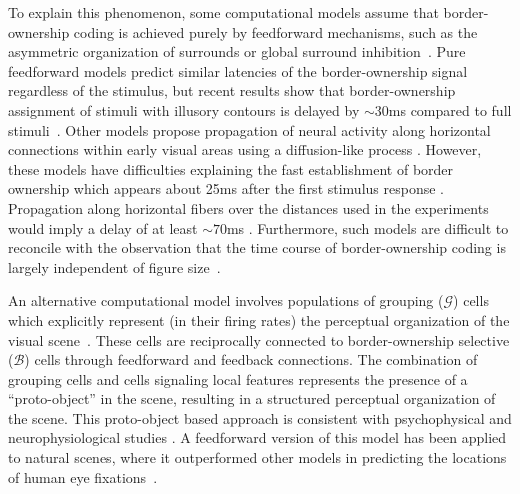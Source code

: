 \documentclass[12pt]{article}
\newcommand{\eg}[0]{{\em e.g.}\xspace}
\begin{document}
 To explain this phenomenon, some computational models assume that
border-ownership coding is achieved purely by feedforward mechanisms, such as the
asymmetric organization of surrounds \citep{Nishimura_Sakai04,
 Nishimura_Sakai05,Sakai_etal12} or global surround inhibition~\citep{Super_etal10}.
 Pure feedforward models predict similar latencies of the border-ownership signal regardless of the stimulus, but recent results show that border-ownership assignment of stimuli with illusory contours is delayed by $\sim30$ms compared to full stimuli~\citep{Hesse_Tsao16}.
  Other models propose
 propagation of neural
activity along horizontal connections within early visual
areas using a diffusion-like process \citep{Grossberg94, Sajda_Finkel95,
Baek_Sajda05, Kikuchi_Akashi01, Pao_etal99,
Zhaoping05}. However, these models have difficulties explaining the
fast establishment of border ownership which appears about 25ms after
the first stimulus response \citep{Zhou_etal00}.
 Propagation along horizontal fibers over the
distances used in the experiments would imply a delay of at least $\sim70$ms \citep[][based on the conduction velocity of horizontal fibers in primate V1 cortex; we are not aware of corresponding data for V2]{Girard_etal01}. Furthermore, such models are difficult to reconcile with the observation that the time course of border-ownership coding is largely independent of figure
size~\citep{Sugihara_etal11}.

An alternative computational model involves populations of grouping
($\mathcal{G}$) cells which explicitly represent (in their firing rates) the
perceptual organization of the visual
scene~\citep{Craft_etal07,Mihalas_etal11b}. These cells are reciprocally connected to
border-ownership selective ($\mathcal{B}$) cells through feedforward and
feedback connections.  The combination of grouping cells and cells
signaling local features represents the presence of a ``proto-object''
\citep{Rensink00a} in the scene, resulting in a structured perceptual
organization of the scene. 
This proto-object based approach is consistent with psychophysical and
neurophysiological studies
\citep[\eg][]{Duncan84,Egly_etal94,Scholl01,Kimchi_etal07,Qiu_etal07,Ho_Yeh09,Poort_etal12}. A feedforward version of this model
has been applied to natural scenes, where it outperformed other models
in predicting the locations of human eye
fixations~\citep{Russell_etal14}.
\end{document}

